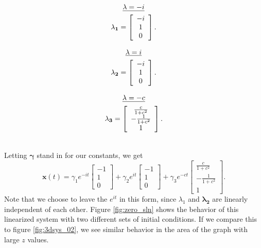 \documentclass{article}
\begin{document}
\begin{minipage}{0.3\textwidth}
	\begin{gather*}
		\text{\underline{$\lambda=-i$}}\\
		\mathbf{\lambda_{1}}=\left[
		\begin{array}{c}
			-i \\
			1  \\
			0
		\end{array}
		\right].
	\end{gather*}
\end{minipage}
\begin{minipage}{0.3\textwidth}
	\begin{gather*}
		\text{\underline{$\lambda=i$}}\\
		\mathbf{\lambda_{2}}=\left[
		\begin{array}{c}
			-i \\
			1 \\
			0
		\end{array}
		\right].
	\end{gather*}
\end{minipage}
\begin{minipage}{0.3\textwidth}
	\begin{gather*}
		\text{\underline{$\lambda=-c$}}\\
		\mathbf{\lambda_{3}}=\left[
		\begin{array}{c}
			\frac{c}{1+c^{2}}  \\
			-\frac{1}{1+c^{2}} \\
			1
		\end{array}
		\right].
	\end{gather*}
\end{minipage}

\noindent\\
\noindent Letting $\mathbf{\gamma}$ stand in for our constants, we get
\[
	\mathbf{x}(t) =
	\gamma_{1}e^{-it}\left[
	\begin{array}{c}
		-1 \\
		1  \\
		0
	\end{array}
	\right] +
	\gamma_{2}e^{it}
	\left[
	\begin{array}{c}
		-1 \\
		1 \\
		0
	\end{array}
	\right] +
	\gamma_{3}e^{-ct}\left[
	\begin{array}{c}
		\frac{c}{1+c^{2}}  \\
		-\frac{1}{1+c^{2}} \\
		1
	\end{array}
	\right].
\]
Note that we choose to leave the $e^{it}$ in this form, since \textbf{${\lambda_{1}}$} and $\mathbf{\lambda_{2}}$ are linearly independent of each other. Figure \ref{fig:zero_sln} shows the behavior of this linearized system with two different sets of initial conditions. If we compare this to figure \ref{fig:3dsys_02}, we see similar behavior in the area of the graph with large $z$ values.
\end{document}
